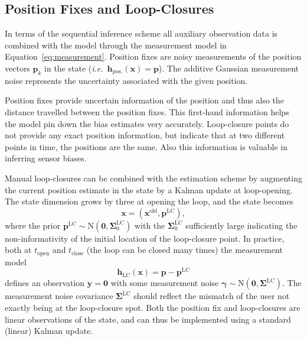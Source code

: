 \documentclass[conference]{ieeetran}
\newcommand{\N}{\mathrm{N}}
\newcommand{\mbf}[1]{\mathbf{#1}}
\newcommand{\vect}[1]{\mbf{#1}}
\newcommand{\vectb}[1]{\bm{#1}}
\newcommand{\ie}{\textit{i.e.}}
\begin{document}
\subsection{Position Fixes and Loop-Closures}
\noindent
In terms of the sequential inference scheme all auxiliary observation data is combined with the model through the measurement model in Equation~\ref{eq:measurement}. Position fixes are noisy measurements of the position vectors $\vect{p}_k$ in the state (\ie\ $\vect{h}_\mathrm{pos.}(\vect{x}) = \vect{p}$). The additive Gaussian measurement noise represents the uncertainty associated with the given position.

Position fixes provide uncertain information of the position and thus also the distance travelled between the position fixes. This first-hand information helps the model pin down the bias estimates very accurately. Loop-closure points do not provide any exact position information, but indicate that at two different points in time, the positions are the same. Also this information is valuable in inferring sensor biases.

Manual loop-closures can be combined with the estimation scheme by augmenting the current position estimate in the state by a Kalman update at loop-opening. The state dimension grows by three at opening the loop, and the state becomes
\begin{equation}
  \vect{x} = (\vect{x}^\mathrm{old}, \vect{p}^\mathrm{LC}), 
\end{equation}
where the prior $\vect{p}^\mathrm{LC} \sim \N(\vect{0}, \vectb{\Sigma}_0^\mathrm{LC})$ with the $ \vectb{\Sigma}_0^\mathrm{LC}$ sufficiently large indicating the non-informativity of the initial location of the loop-closure point. In practice, both at $t_\mathrm{open}$ and $t_\mathrm{close}$ (the loop can be closed many times) the measurement model
\begin{equation}
  \vect{h}_\mathrm{LC}(\vect{x}) = \vect{p} - \vect{p}^\mathrm{LC}
\end{equation}
defines an observation $\vect{y}=\vect{0}$ with some measurement noise $\vectb{\gamma} \sim \N(\vect{0}, \vectb{\Sigma}^\mathrm{LC})$. The measurement noise covariance $\vectb{\Sigma}^\mathrm{LC}$ should reflect the mismatch of the user not exactly being at the loop-closure spot. Both the position fix and loop-closures are linear observations of the state, and can thus be implemented using a standard (linear) Kalman update.
\end{document}
